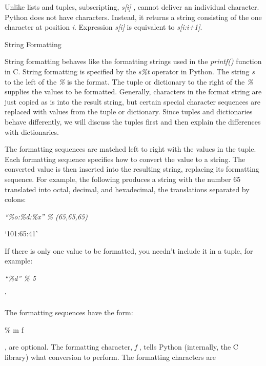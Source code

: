 Unlike lists and tuples,
subscripting, \emph{s{[}i{]}} , cannot deliver an individual character.
Python does not have characters. Instead, it returns a string consisting
of the one character at position \emph{i}. Expression \emph{s{[}i{]}}
is equivalent to \emph{s{[}i:i+1{]}}.

String Formatting

String formatting behaves like the
formatting strings used in the \emph{printf()} function in C. String
formatting is specified by the \emph{s\%t} operator in Python. The
string \emph{s} to the left of the \emph{\%} is the format. The tuple or
dictionary to the right of the \emph{\%} supplies the values to be
formatted. Generally, characters in the format string are just copied as
is into the result string, but certain special character sequences are
replaced with values from the tuple or dictionary. Since tuples and
dictionaries behave differently, we will discuss the tuples first and
then explain the differences with dictionaries.

 The formatting
sequences are matched left to right with the values in the tuple. Each
formatting sequence specifies how to convert the value to a string. The
converted value is then inserted into the resulting string, replacing
its formatting sequence. For example, the following produces a string
with the number 65 translated into octal, decimal, and hexadecimal, the
translations separated by colons:


\emph{``\%o:\%d:\%x'' \% (65,65,65)}

`101:65:41'

If there is only one value to be
formatted, you needn't include it in a tuple, for example:


\emph{``\textbar{}\%d\textbar{}'' \% 5}

'

The formatting sequences have the
form:

\% m f

 , are
optional. The formatting character, \emph{f} , tells Python (internally,
the C library) what conversion to perform. The formatting characters are


